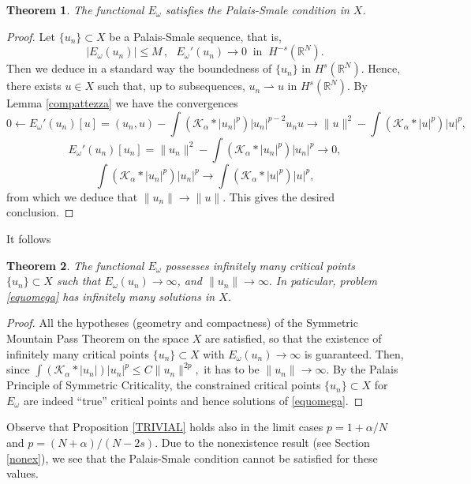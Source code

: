 \documentclass[10pt]{amsart}
\numberwithin{equation}{section}
\newtheorem{theorem}{Theorem}[section]
\begin{document}
\begin{theorem}
The functional $E_{\omega}$ 
satisfies the Palais-Smale condition in $X$.

\end{theorem}
\begin{proof}
Let   $\{u_{n}\}\subset X$ be a Palais-Smale sequence, that is, 
\begin{equation*} 
\left|E_{\omega}(u_{n})\right|\leq M\,, \ \ \  E_{\omega}'(u_{n})\to 0 \ \text{ in } \ H^{-s}(\mathbb R^{N}).
\end{equation*}
Then
we deduce in a standard way the boundedness of $\{u_{n}\}$ in  ${H^{s}(\mathbb R^{N})}$.
Hence, there exists $u\in X$ such that, up to subsequences, $u_{n}\rightharpoonup u$ in ${H^{s}(\mathbb R^{N})}$.
By  Lemma \ref{compattezza} 
we have the convergences
$$
0\longleftarrow E_{\omega}'(u_{n})[u]=(u_{n},u)-\int (\mathcal K_{\alpha}*|u_{n}|^{p})|u_{n}|^{p-2}u_{n}u\longrightarrow
\|u\|^{2}-\int{{(\mathcal K_{\alpha}*|u|^{p})}} |u|^{p},
$$
$$E_{\omega}'(u_{n})[u_{n}]=\|u_{n}\|^{2}-\int  (\mathcal K_{\alpha}*|u_{n}|^{p})|u_{n}|^{p}\longrightarrow 0,$$
$$\int  (\mathcal K_{\alpha}*|u_{n}|^{p})|u_{n}|^{p} \longrightarrow \int {{(\mathcal K_{\alpha}*|u|^{p})}} |u|^{p},$$
from which we deduce that $\|u_{n}\| \to \|u\|.$
This gives the desired conclusion.
\end{proof}

\noindent
It follows

\begin{theorem}
\label{multy-thm}
The functional $E_{\omega}$ 
possesses infinitely many critical points $\{u_{n}\}\subset X$ such that
$E_{\omega}(u_{n})\to \infty$, and $\|u_{n}\|\to \infty.$
In paticular, problem \eqref{equomega} has  infinitely many solutions in $X$.
\end{theorem}
\begin{proof}
All the hypotheses (geometry and compactness) of the Symmetric Mountain Pass Theorem
on the space $X$  are satisfied, so that the existence of infinitely many critical points $\{u_{n}\}\subset X$ with $E_{\omega}(u_{n})\to \infty$
is guaranteed.
Then, since $\int (\mathcal K_{\alpha} *|u_{n}|)|u_{n}|^{p}\leq C \|u_{n}\|^{2p},$
it has to be $\|u_{n}\|\to \infty.$
 By the Palais Principle of Symmetric Criticality, 
 the constrained critical points $\{u_{n}\}\subset X$ for $E_{\omega}$ are indeed ``true'' critical points
 and hence solutions of \eqref{equomega}.
\end{proof}

\noindent Observe that Proposition \ref{TRIVIAL} holds also in the limit cases $p=1+{\alpha}/{N}$ and $ p=(N+\alpha)/(N-2s)$.
Due to the nonexistence result (see  Section \ref{nonex}), we see that the Palais-Smale condition cannot be satisfied
for these values.
\end{document}
